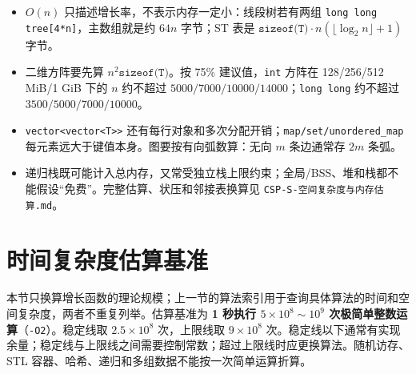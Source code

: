 \documentclass[a4paper,11pt]{article}
\newcommand{\code}[1]{\texttt{#1}}
\begin{document}
\begin{itemize}
  \item $O(n)$ 只描述增长率，不表示内存一定小：线段树若有两组 \code{long long tree[4*n]}，主数组就是约 $64n$ 字节；ST 表是 $\code{sizeof(T)}\cdot n(\lfloor\log_2n\rfloor+1)$ 字节。
  \item 二维方阵要先算 $n^2\code{sizeof(T)}$。按 75\% 建议值，\code{int} 方阵在 128/256/512 MiB/1 GiB 下的 $n$ 约不超过 $5000/7000/10000/14000$；\code{long long} 约不超过 $3500/5000/7000/10000$。
  \item \code{vector<vector<T>>} 还有每行对象和多次分配开销；\code{map/set/unordered\_map} 每元素远大于键值本身。图要按有向弧数算：无向 $m$ 条边通常存 $2m$ 条弧。
  \item 递归栈既可能计入总内存，又常受独立栈上限约束；全局/BSS、堆和栈都不能假设“免费”。完整估算、状压和邻接表换算见 \code{CSP-S-空间复杂度与内存估算.md}。
\end{itemize}

\newpage
\section{时间复杂度估算基准}

本节只换算增长函数的理论规模；上一节的算法索引用于查询具体算法的时间和空间复杂度，两者不重复列举。估算基准为 \textbf{1 秒执行 $5\times10^8\sim10^9$ 次极简单整数运算}（\code{-O2}）。稳定线取 $2.5\times10^8$ 次，上限线取 $9\times10^8$ 次。稳定线以下通常有实现余量；稳定线与上限线之间需要控制常数；超过上限线时应更换算法。随机访存、STL 容器、哈希、递归和多组数据不能按一次简单运算折算。
\end{document}
